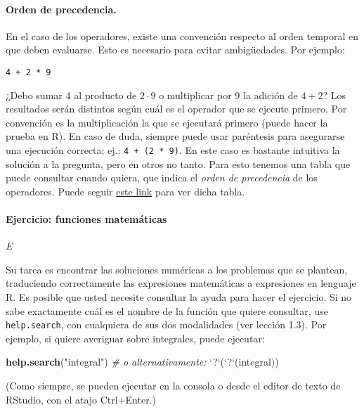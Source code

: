 \documentclass[]{article}
\newenvironment{Shaded}{}{}
\newcommand{\KeywordTok}[1]{\textcolor[rgb]{0.00,0.44,0.13}{\textbf{{#1}}}}
\newcommand{\DataTypeTok}[1]{\textcolor[rgb]{0.56,0.13,0.00}{{#1}}}
\newcommand{\StringTok}[1]{\textcolor[rgb]{0.25,0.44,0.63}{{#1}}}
\newcommand{\CommentTok}[1]{\textcolor[rgb]{0.38,0.63,0.69}{\textit{{#1}}}}
\newcommand{\NormalTok}[1]{{#1}}
\begin{document}
\paragraph{Orden de precedencia.}

En el caso de los operadores, existe una convención respecto al orden
temporal en que deben evaluarse. Esto es necesario para evitar
ambigüedades. Por ejemplo:

\begin{verbatim}
4 + 2 * 9
\end{verbatim}
¿Debo sumar 4 al producto de $2 \cdot 9$ o multiplicar por 9 la adición
de $4 + 2$? Los resultados serán distintos según cuál es el operador que
se ejecute primero. Por convención es la multiplicación la que se
ejecutará primero (puede hacer la prueba en R). En caso de duda, siempre
puede usar paréntesis para asegurarse una ejecución correcta; ej.:
\texttt{4 + (2 * 9)}. En este caso es bastante intuitiva la solución a
la pregunta, pero en otros no tanto. Para esto tenemos una tabla que
puede consultar cuando quiera, que indica el \emph{orden de precedencia}
de los operadores. Puede seguir
\href{https://www.dropbox.com/s/7a3q3xgax777zdq/2.0.1-orden-de-precedencia.pdf}{este
link} para ver dicha tabla.

\paragraph{Ejercicio: funciones matemáticas}

\emph{E}

Su tarea es encontrar las soluciones numéricas a los problemas que se
plantean, traduciendo correctamente las expresiones matemáticas a
expresiones en lenguaje R. Es posible que usted necesite consultar la
ayuda para hacer el ejercicio. Si no sabe exactamente cuál es el nombre
de la función que quiere consultar, use \texttt{help.search}, con
cualquiera de sus dos modalidades (ver lección 1.3). Por ejemplo, si
quiere averiguar sobre integrales, puede ejecutar:

\begin{Shaded}
\begin{Highlighting}[]
\KeywordTok{help.search}\NormalTok{(}\StringTok{"integral"}\NormalTok{)}
\CommentTok{# o alternativamente:}
\StringTok{`}\DataTypeTok{?}\StringTok{`}\NormalTok{(}\StringTok{`}\DataTypeTok{?}\StringTok{`}\NormalTok{(integral))}
\end{Highlighting}
\end{Shaded}
(Como siempre, se pueden ejecutar en la consola o desde el editor de
texto de RStudio, con el atajo Ctrl+Enter.)
\end{document}
